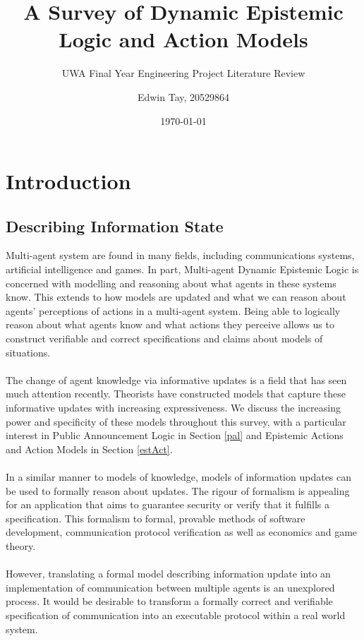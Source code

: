 \documentclass[12pt, a4paper, titlepage]{scrartcl}
\begin{document}
\title{A Survey of Dynamic Epistemic Logic and Action Models}
\subtitle{UWA Final Year Engineering Project Literature Review}
\author{Edwin Tay, 20529864}
\date{\today}

\maketitle

\pagebreak

\tableofcontents

\vfill
\pagebreak

\section{Introduction}\label{intro}
\subsection{Describing Information State}\label{intro_infoState}
Multi-agent system are found in many fields, including communications systems,
artificial intelligence and games.
In part, Multi-agent Dynamic Epistemic Logic is concerned with modelling and reasoning
about what agents in these systems know.
This extends to how models are updated and what we can reason about agents'
perceptions of actions in a multi-agent system.
Being able to logically reason about what agents know and what actions they perceive
allows us to construct verifiable and correct specifications and claims about
models of situations.\\
\\
The change of agent knowledge via informative updates is a field that has seen
much attention recently.
Theorists have constructed models that capture these informative updates with
increasing expressiveness.
We discuss the increasing power and specificity of these models throughout this
survey, with a particular interest in Public Announcement Logic in Section
\ref{pal} and Epistemic Actions and Action Models in Section \ref{estAct}. \\
\\
In a similar manner to models of knowledge, models of information updates can be
used to formally reason about updates.
The rigour of formalism is appealing for an application that aims to guarantee
security or verify that it fulfills a specification.
This formalism to formal, provable methods of software development,
communication protocol verification as well as economics and game theory.\\
\\
However, translating a formal model describing information update into an
implementation of communication between multiple agents is an unexplored
process.
It would be desirable to transform a formally correct and verifiable specification of
communication into an executable protocol within a real world system.
\end{document}
